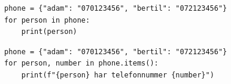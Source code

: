 \begin{frame}[fragile]
  \begin{example}
    \begin{verbatim}
phone = {"adam": "070123456", "bertil": "072123456"}
for person in phone:
    print(person)
    \end{verbatim}
  \end{example}

  \begin{example}
    \begin{verbatim}
phone = {"adam": "070123456", "bertil": "072123456"}
for person, number in phone.items():
    print(f"{person} har telefonnummer {number}")
    \end{verbatim}
  \end{example}
\end{frame}

